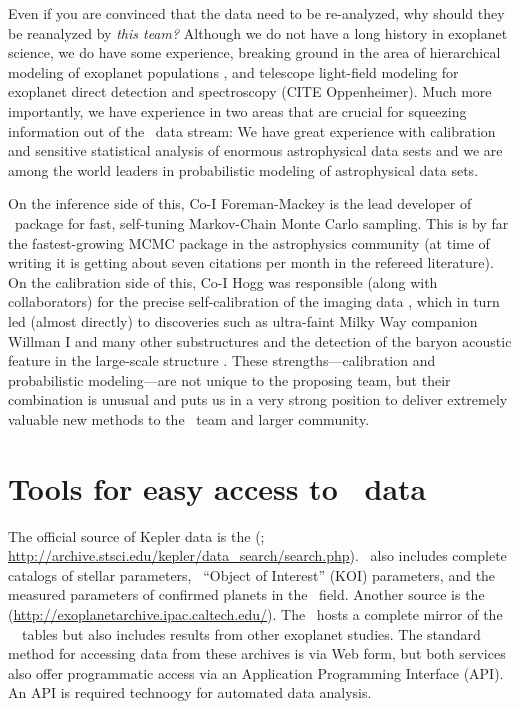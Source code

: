 \documentclass[letterpaper,12pt,preprint]{hack_aastex}
\newcommand{\emcee}{\package{emcee}}
\begin{document}
Even if you are convinced that the data need to be re-analyzed, why
should they be reanalyzed by \emph{this team?}  Although we do not
have a long history in exoplanet science, we do have some experience,
breaking ground in the area of hierarchical modeling of exoplanet
populations \citep{hogg-ecc}, and telescope light-field modeling for
exoplanet direct detection and spectroscopy (CITE Oppenheimer).  Much
more importantly, we have experience in two
areas that are crucial for squeezing information out
of the \Kepler\ data stream: We have great experience with calibration
and sensitive statistical analysis of enormous astrophysical data
sests and we are among the world leaders in
probabilistic modeling of astrophysical data sets.

On the inference side of this,
Co-I Foreman-Mackey is the lead developer of \emcee\
package \citep{emcee} for fast, self-tuning Markov-Chain Monte Carlo sampling.
This is by far the fastest-growing MCMC package in the astrophysics community
 (at time of writing it is getting about seven citations per month in the
refereed literature).
On the calibration side of this,
Co-I Hogg was responsible (along with collaborators) for
the precise self-calibration of the 
imaging data \citep{ubercal}, which in turn led (almost directly)
to discoveries such as ultra-faint Milky Way companion Willman I
 \citep{wil1} and many other substructures \citep[for example,][]{wil2, field, gd1} and the detection of the baryon acoustic feature
in the large-scale structure \citep{bao}.  These
strengths---calibration and probabilistic modeling---are not unique to
the proposing team, but their combination is unusual and puts us in a
very strong position to deliver extremely valuable new methods to the
\Kepler\ team and larger community.

\section{Tools for easy access to \Kepler\ data}

The official source of Kepler data is the
(\MAST; \url{http://archive.stsci.edu/kepler/data\_search/search.php}).
\MAST\ also includes complete catalogs of stellar parameters, \Kepler\
``Object of Interest'' (KOI) parameters, and the measured parameters of
confirmed planets in the \Kepler\ field.
Another source is the
 (\url{http://exoplanetarchive.ipac.caltech.edu/}).
The \EA\ hosts a complete mirror of the \MAST\ \Kepler\ tables but
also includes results from other exoplanet studies.
The standard method for accessing data from these archives is via Web
form,
but both services also offer programmatic access via an Application
Programming Interface (API).
An API is required technoogy for automated data analysis.
\end{document}
